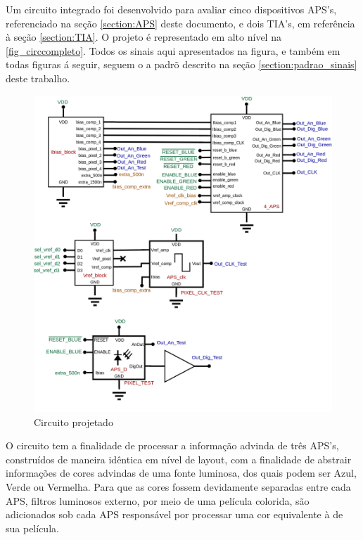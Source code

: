 Um circuito integrado foi desenvolvido para avaliar cinco dispositivos APS's, referenciado na se{\c c}\~ao \ref{section:APS} deste documento, e dois TIA's, em refer\^encia \`a se{\c c}\~ao \ref{section:TIA}. O projeto \'e representado em alto n\'ivel na \autoref{fig_circcompleto}. Todos os sinais aqui apresentados na figura, e tamb\'em em todas figuras \'a seguir, seguem o a padr\~o descrito na se{\c c}\~ao \ref{section:padrao_sinais} deste trabalho.

\begin{figure}[htb]
	\caption{\label{fig_circcompleto}Circuito projetado}
	\begin{center}
	    \includegraphics[width=\textwidth]{Circuitos/Complete_Circuit.png}
	\end{center}
\end{figure}

O circuito tem a finalidade de processar a informa{\c c}\~ao advinda de tr\^es APS's, constru\'idos de maneira id\^entica em n\'ivel de layout, com a finalidade de abstrair informa{\c c}\~oes de cores advindas de uma fonte luminosa, dos quais podem ser Azul, Verde ou Vermelha. Para que as cores fossem devidamente separadas entre cada APS, filtros luminosos externo, por meio de uma pel\'icula colorida, s\~ao adicionados sob cada APS respons\'avel por processar uma cor equivalente \`a de sua pel\'icula.

